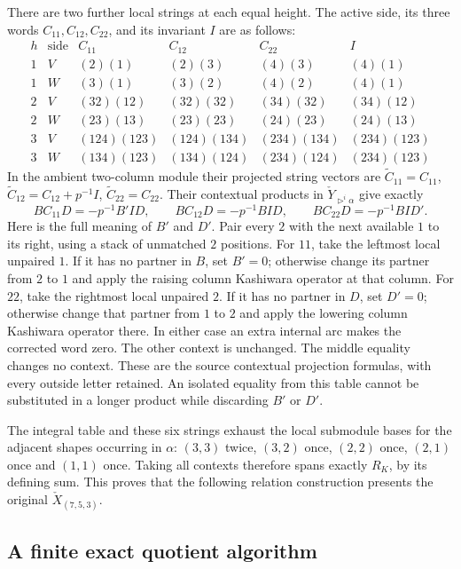 There are two further local strings at each equal height. The
active side, its three words $C_{11},C_{12},C_{22}$, and its
invariant $I$ are as follows:
\[
\begin{array}{c|c|ccc|c}
h&\text{side}&C_{11}&C_{12}&C_{22}&I\\\hline
1&V&(2)(1)&(2)(3)&(4)(3)&(4)(1)\\
1&W&(3)(1)&(3)(2)&(4)(2)&(4)(1)\\
2&V&(32)(12)&(32)(32)&(34)(32)&(34)(12)\\
2&W&(23)(13)&(23)(23)&(24)(23)&(24)(13)\\
3&V&(124)(123)&(124)(134)&(234)(134)&(234)(123)\\
3&W&(134)(123)&(134)(124)&(234)(124)&(234)(123)
\end{array}
\]
In the ambient two-column module their projected string vectors
are $\widetilde C_{11}=C_{11}$,
$\widetilde C_{12}=C_{12}+p^{-1}I$,
$\widetilde C_{22}=C_{22}$.  Their contextual products in
$\check Y_{\triangleright^i\alpha}$ give exactly
\begin{equation}\label{eq:full-contextual-relations}
 BC_{11}D=-p^{-1}B'ID,\qquad
 BC_{12}D=-p^{-1}BID,\qquad
 BC_{22}D=-p^{-1}BID'.
\end{equation}
Here is the full meaning of $B'$ and $D'$. Pair every $2$ with
the next available $1$ to its right, using a stack of unmatched
$2$ positions. For $11$, take the leftmost local unpaired $1$.
If it has no partner in $B$, set $B'=0$; otherwise change its
partner from $2$ to $1$ and apply the raising column Kashiwara
operator at that column. For $22$, take the rightmost local
unpaired $2$. If it has no partner in $D$, set $D'=0$;
otherwise change that partner from $1$ to $2$ and apply the
lowering column Kashiwara operator there. In either case an
extra internal arc makes the corrected word zero. The other
context is unchanged. The middle equality changes no context.
These are the source contextual projection formulas, with every
outside letter retained. An isolated equality from this table
cannot be substituted in a longer product while discarding
$B'$ or $D'$.

The integral table and these six strings exhaust the local
submodule bases for the adjacent shapes occurring in $\alpha$:
$(3,3)$ twice, $(3,2)$ once, $(2,2)$ once, $(2,1)$ once and
$(1,1)$ once. Taking all contexts therefore spans exactly $R_K$,
by its defining sum. This proves that the following relation
construction presents the original $\check X_{(7,5,3)}$.

\subsection{A finite exact quotient algorithm}

